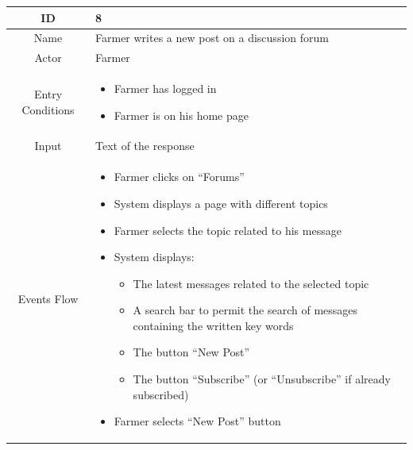 \documentclass{article}
\begin{document}
\begin{center}
    \newpage






    
    \begin{longtable}{|c| p{10cm}|}
        \hline
            ID & 8 \\
        \hline
            Name & Farmer writes a new post on a discussion forum\\
        \hline
            Actor & Farmer \\
        \hline
            Entry Conditions & 
                                \begin{itemize}
                                    \item Farmer has logged in
                                    \item Farmer is on his home page
                                \end{itemize}\\
        \hline
            Input & Text of the response \\
        \hline
            Events Flow &   \begin{itemize}
                                \item Farmer clicks on “Forums”
                                \item System displays a page with different topics 
                                \item Farmer selects the topic related to his message
                                \item System displays:
                                            \begin{itemize}
                                                \item The latest messages related to the selected topic
                                                \item A search bar to permit the search of messages containing the written key words
                                                \item The button “New Post” 
                                                \item The button “Subscribe” (or “Unsubscribe” if already subscribed)
                                            \end{itemize}
                                \item Farmer selects “New Post” button

\end{itemize}
\end{longtable}
\end{center}
\end{document}

